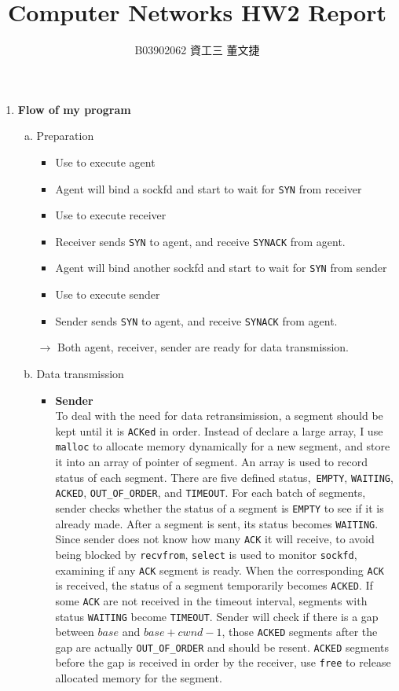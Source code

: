 \documentclass[12pt, a4paper]{article}
\date{}
\title{\vspace{-3.0cm} Computer Networks HW2 Report \\ \vspace{0.5cm}}
\author{\normalsize B03902062 資工三 \hspace{0cm} 董文捷}
\begin{document}
\maketitle
\begin{enumerate}

\item
\textbf{Flow of my program}
\begin{enumerate}[(a)] 
\item Preparation
\begin{itemize}
\item Use  to execute agent
\item Agent will bind a sockfd and start to wait for \texttt{SYN} from receiver
\item Use  to execute receiver
\item Receiver sends \texttt{SYN} to agent, and receive \texttt{SYNACK} from agent. 
\item Agent will bind another sockfd and start to wait for \texttt{SYN} from sender
\item Use  to execute sender
\item Sender sends \texttt{SYN} to agent, and receive \texttt{SYNACK} from agent. 
\end{itemize}
$\longrightarrow$ Both agent, receiver, sender are ready for data transmission.
\item Data transmission
\begin{itemize}
\item \textbf{Sender} \\
To deal with the need for data retransimission, a segment should be kept until it is \texttt{ACKed} in order. Instead of declare a large array, I use \texttt{malloc} to allocate memory dynamically for a new segment, and store it into an array of pointer of segment. An array is used to record status of each segment. There are five defined status,\mbox{ }\texttt{EMPTY}, \texttt{WAITING}, \texttt{ACKED}, \texttt{OUT\_OF\_ORDER}, and \texttt{TIMEOUT}. For each batch of segments, sender checks whether the status of a segment is \texttt{EMPTY} to see if it is already made. After a segment is sent, its status becomes \texttt{WAITING}. Since sender does not know how many \texttt{ACK} it will receive, to avoid being blocked by \texttt{recvfrom}, \texttt{select} is used to monitor \texttt{sockfd}, examining if any \texttt{ACK} segment is ready. When the corresponding \texttt{ACK} is received, the status of a segment temporarily becomes \texttt{ACKED}. If some \texttt{ACK} are not received in the timeout interval, segments with status \texttt{WAITING} become \texttt{TIMEOUT}. Sender will check if there is a gap between $base$ and $base + cwnd - 1$, those \texttt{ACKED} segments after the gap are actually \texttt{OUT\_OF\_ORDER} and should be resent. \texttt{ACKED} segments before the gap is received in order by the receiver, use \texttt{free} to release allocated memory for the segment.

\end{itemize}
\end{enumerate}
\end{enumerate}
\end{document}

